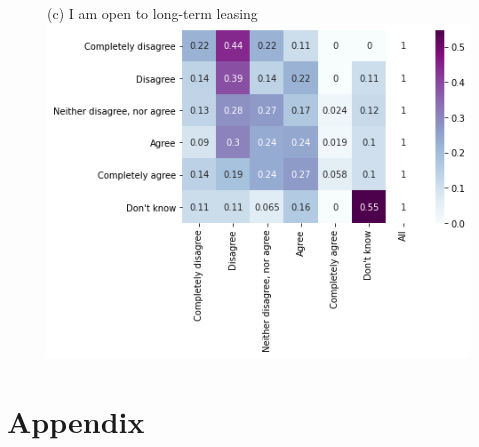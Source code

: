 \documentclass[12pt]{article}
\newcommand{\ar}{$\Rightarrow$ \ }
\begin{document}
\begin{figure}[h!!]
\begin{minipage}[h!!]{0.32\textwidth}
	\end{minipage}
	\begin{minipage}[h!!]{0.32\textwidth}  
		\centering\footnotesize{(c) I am open to long-term leasing}
		\includegraphics[width=1\textwidth]{../codding_data/results/liss/conditional_heatmap183_141labels0.png}
	\end{minipage}
\end{figure}



\newpage
\appendix
\section*{Appendix}
\end{document}
